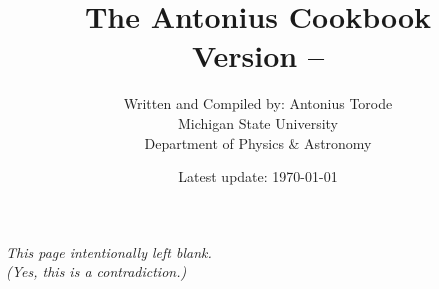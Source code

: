 \documentclass[a4paper,11pt]{book}
\title{{\huge \textbf{The Antonius Cookbook} \\ \textbf{Version -- \Version}} \\ \vspace{1cm}
}
\author{Written and Compiled by: Antonius Torode \\ Michigan State University \\ Department of Physics \& Astronomy}
\date{Latest update: \today}
\begin{document}
	
\AddToShipoutPicture*{\ChickenSalad}

\frontmatter
\clearpage
\maketitle


	\begin{multicols}{2}
		\tableofcontents
	\end{multicols}

\thispagestyle{fancy}

\newpage
\thispagestyle{fancy}
\AddToShipoutPicture*{\whiteflowers}
\vspace*{\fill}
\begin{center}
	\textit{This page intentionally left blank. \\ (Yes, this is a contradiction.)}
\end{center}
\vspace*{\fill}

\mainmatter
\pagestyle{fancy}

%




%






































%

%
%

%

\backmatter
\end{document}
